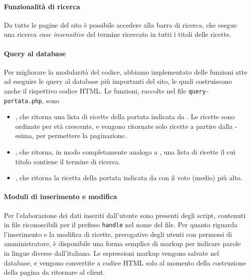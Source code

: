 \paragraph{Funzionalità di ricerca}

Da tutte le pagine del sito è possibile accedere alla barra di ricerca, che esegue una ricerca \textit{case insensitive} del termine ricercato in tutti i titoli delle ricette.

\paragraph{Query al database}

Per migliorare la modularità del codice, abbiamo implementato delle funzioni atte ad eseguire le query al database più importanti del sito, le quali costruiscono anche il rispettivo codice HTML.
Le funzioni, raccolte nel file \texttt{query-portata.php}, sono
\begin{itemize}
	\item {}, che ritorna una lista di ricette della portata indicata da . Le ricette sono ordinate per età crescente, e vengono ritornate solo  ricette a partire dalla -esima, per permettere la paginazione.
	\item {}, che ritorna, in modo completamente analogo a , una lista di ricette il cui titolo contiene il termine di ricerca.
	\item {}, che ritorna la ricetta della portata indicata da  con il voto (medio) più alto.
\end{itemize}

\paragraph{Moduli di inserimento e modifica}

Per l'elaborazione dei dati inseriti dall'utente sono presenti degli script, contenuti in file riconoscibili per il prefisso \texttt{handle} nel nome del file.
Per quanto riguarda l'inserimento e la modifica di ricette, prerogative degli utenti con permessi di amministratore, è disponibile una forma semplice di markup per indicare parole in lingue diverse dall'italiano.
Le espressioni markup vengono salvate nel database, e vengono convertite a codice HTML solo al momento della costruzione della pagina da ritornare al client.

